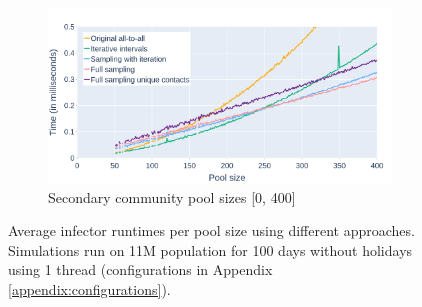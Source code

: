 \begin{figure}
    \begin{subfigure}{.8\linewidth}
        \centering
        \includegraphics[width=\textwidth]{4 - Sampling/fig/full_sampling_unique_contacts/times_avg_fsuc_secondary.png}
        \caption{Secondary community pool sizes [0, 400]}
        \label{fig:times_avg_fsuc_secondary}
    \end{subfigure}
    \caption{Average infector runtimes per pool size using different approaches. Simulations run on 11M population for 100 days without holidays using 1 thread (configurations in Appendix \ref{appendix:configurations}).}
\end{figure}
